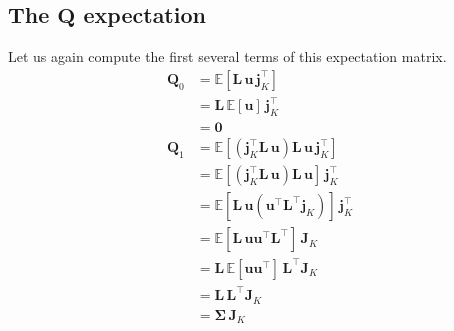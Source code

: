 \documentclass[modern]{aastex62}
\begin{document}
\subsection{The $\mathbf{Q}$ expectation}
%
Let us again compute the first several terms of this expectation matrix.
%
\begin{align}
    \mathbf{Q}_0 & = \mathbb{E}\left[ \mathbf{L} \, \mathbf{u} \, \mathbf{j}_K^\top \right]
    \nonumber                                                                                                                                       \\
                 & = \mathbf{L} \, \mathbb{E}\left[  \mathbf{u} \right] \, \mathbf{j}_K^\top
    \nonumber                                                                                                                                       \\
                 & = \mathbf{0}
    \\[1em]
    \mathbf{Q}_1 & = \mathbb{E}\left[ \left(\mathbf{j}_K^\top \mathbf{L} \, \mathbf{u}\right) \mathbf{L} \, \mathbf{u} \, \mathbf{j}_K^\top \right]
    \nonumber                                                                                                                                       \\
                 & = \mathbb{E}\left[ \left(\mathbf{j}_K^\top \mathbf{L} \, \mathbf{u}\right) \mathbf{L} \, \mathbf{u} \right] \, \mathbf{j}_K^\top
    \nonumber                                                                                                                                       \\
                 & = \mathbb{E}\left[ \mathbf{L} \, \mathbf{u} (\mathbf{u}^\top \mathbf{L}^\top \mathbf{j}_K) \right] \, \mathbf{j}_K^\top
    \nonumber                                                                                                                                       \\
                 & = \mathbb{E}\left[ \mathbf{L} \, \mathbf{u} \mathbf{u}^\top \mathbf{L}^\top  \right] \, \mathbf{J}_K
    \nonumber                                                                                                                                       \\
                 & = \mathbf{L} \, \mathbb{E}\left[  \mathbf{u} \mathbf{u}^\top   \right]  \, \mathbf{L}^\top \mathbf{J}_K
    \nonumber                                                                                                                                       \\
                 & = \mathbf{L} \, \mathbf{L}^\top \mathbf{J}_K
    \nonumber                                                                                                                                       \\
                 & = \pmb{\Sigma} \, \mathbf{J}_K
\end{align}
\end{document}
